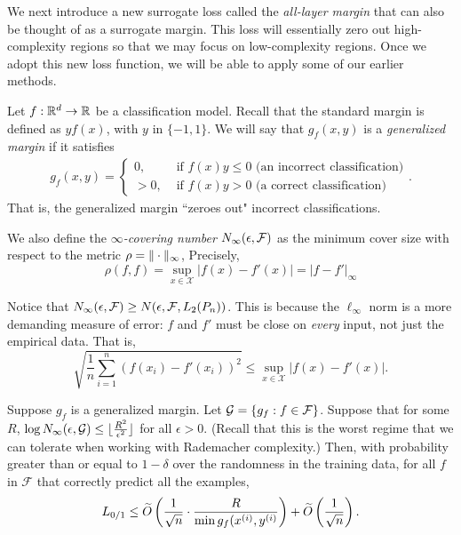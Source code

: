 We next introduce a new surrogate loss called the \textit{all-layer margin} that can also be thought of as a surrogate margin. This loss will essentially zero out high-complexity regions so that we may focus on low-complexity regions. Once we adopt this new loss function, we will be able to apply some of our earlier methods.

Let $f: \mathbb R^d \to \mathbb R$ be a classification model. Recall that the standard margin is defined as $y f(x)$, with $y$ in $\{-1, 1\}$. We will say that $g_f(x, y)$ is a \textit{generalized margin} if it satisfies
\begin{align}
    g_f(x, y) = \begin{cases}
0,& \text{ if } f(x)y \leq 0 \text{ (an incorrect classification)}\\
> 0,& \text{ if } f(x)y > 0 \text{ (a correct classification)}
\end{cases}.
\end{align}
That is, the generalized margin ``zeroes out" incorrect classifications.

We also define the \textit{$\infty$-covering number} $N_\infty(\epsilon, \mathcal F)$ as the minimum cover size with respect to the metric $\rho = \|\cdot\|_\infty$, Precisely,
\begin{equation}
\rho(f, f) = \sup_{x \in \mathcal{X}} |f(x) - f'(x)| = |f - f'|_\infty
\end{equation}
\begin{remark}
    Notice that $N_\infty(\epsilon, \mathcal F) \geq N(\epsilon, \mathcal F, L_2(P_n))$. This is because the $\ell_\infty$ norm is a more demanding measure of error: $f$ and $f'$ must be close on \textit{every} input, not just the empirical data. That is,
    \begin{equation}
    \sqrt{\frac{1}{n} \sum_{i=1}^n (f(x_i) - f'(x_i))^2} \leq \sup_{x \in \mathcal{X}} |f(x) - f'(x)|.
    \end{equation}
\end{remark}

\begin{lemma}
Suppose $g_f$ is a generalized margin. Let $\mathcal G = \{g_f: f \in \mathcal{F}\}$. Suppose that for some $R$, $\log N_\infty(\epsilon, \mathcal G) \leq \lfloor \frac{R^2}{\epsilon^2} \rfloor$ for all $\epsilon > 0$. (Recall that this is the worst regime that we can tolerate when working with Rademacher complexity.) Then, with probability greater than or equal to $1 - \delta$ over the randomness in the training data, for all $f$ in $\mathcal{F}$ that correctly predict all the examples,
\begin{equation}
L_{0/1} \leq \widetilde{O} \left (\frac{1}{\sqrt{n}} \cdot \frac{R}{\min g_f(x^{(i)}, y^{(i)}} \right ) + \widetilde{O}\left (\frac{1}{\sqrt{n}}\right ).
\end{equation}
\label{lec11:genmargin-lemma}
\end{lemma}

